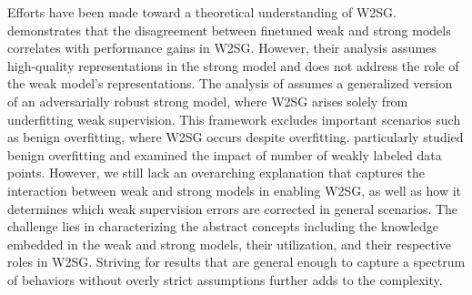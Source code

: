 {Efforts have been made toward a theoretical understanding of W2SG. \citet{charikar2024quantifying} demonstrates that the disagreement between finetuned weak and strong models correlates with performance gains in W2SG. However, their analysis assumes high-quality representations in the strong model and does not address the role of the weak model's representations. The analysis of \cite{lang2024theoretical,shin2024weak} assumes a generalized version of an adversarially robust strong model, where W2SG arises solely from underfitting weak supervision. This framework excludes important scenarios such as benign overfitting, where W2SG occurs despite overfitting. \citet{wu2024provable} %
particularly studied benign overfitting and examined the impact of number of weakly labeled data points. However, we still lack an overarching explanation that captures the interaction between weak and strong models in enabling W2SG, as well as how it determines which weak supervision errors are corrected in general scenarios. The challenge lies in characterizing the abstract concepts including the knowledge embedded in the weak and strong models, their utilization, and their respective roles in W2SG. Striving for results that are general enough to capture a spectrum of behaviors without overly strict assumptions further adds to the complexity.}


